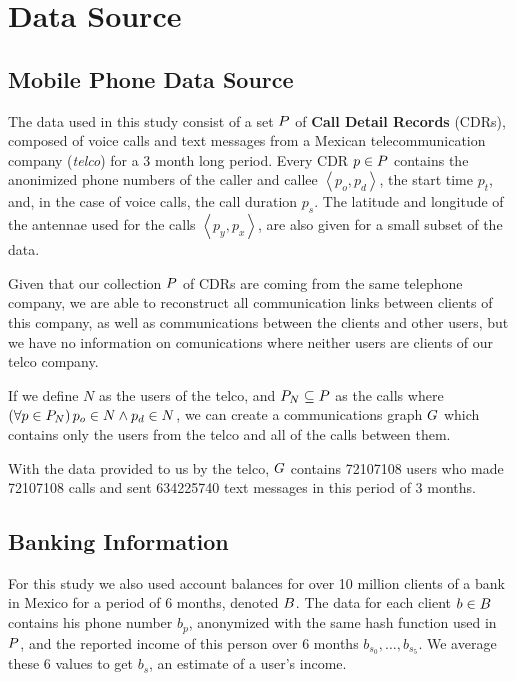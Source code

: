 \section{Data Source}

\subsection{Mobile Phone Data Source}

The data used in this study consist of a set \( \mathlarger{P} \) of \textbf{Call Detail Records} (CDRs), composed of voice calls and text messages from a Mexican telecommunication company (\textit{telco}) for a 3 month long period.
Every CDR \( p \in \mathlarger{P} \)  contains the anonimized phone numbers of the caller and callee \( \left< p_o, p_d \right> \), the start time \( p_t \), and, in the case of voice calls, the call duration \( p_s \). 
The latitude and longitude of the antennae used for the calls \( \left< p_y, p_x \right> \), are also given for a small subset of the data.

Given that our collection \( \mathlarger{P} \) of CDRs are coming from the same telephone company, we are able to reconstruct all communication links between clients of this company, as well as communications between the clients and other users, but we have no information on comunications where neither users are clients of our telco company.

If we define \( N \) as the users of the telco, and \( \mathlarger{P}_N \subseteq \mathlarger{P} \) as the calls where \( \left( \forall p \in \mathlarger{P}_N \right) p_o \in N \wedge p_d \in N \), we can create a communications graph \( \mathlarger{G} \) which contains only the users from the telco and all of the calls between them.

With the data provided to us by the telco, \( \mathlarger{G} \) contains \num{72107108} users who made \num{72107108} calls and sent \num{634225740} text messages in this period of 3 months.

\subsection{Banking Information}

For this study we also used account balances for over 10 million clients of a bank in Mexico for a period of 6 months, denoted \( \mathlarger{B} \). The data for each client \( b \in \mathlarger{B} \) contains his phone number \( b_p \), anonymized with the same hash function used in \( \mathlarger{P} \), and the reported income of this person over 6 months \( b_{s_0}, \ldots, b_{s_5} \). We average these 6 values to get \( b_s \), an estimate of a user's income.

